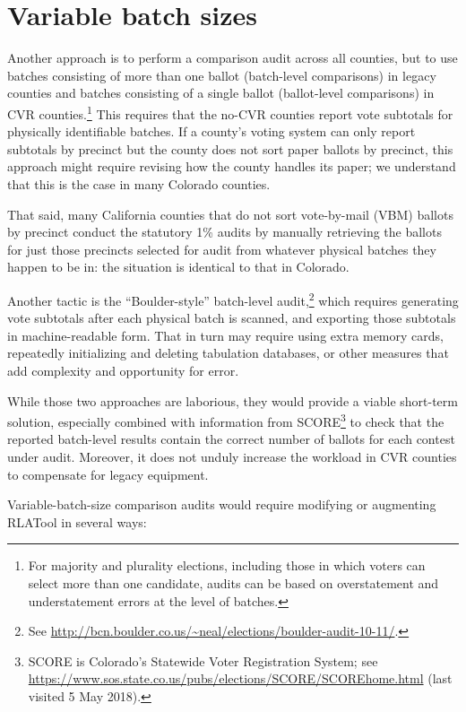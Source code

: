 \documentclass[runningheads]{llncs}
\begin{document}
\section{Variable batch sizes} \label{sec:variable}

Another approach is to perform a comparison audit across all counties, but to use batches consisting
of more than one ballot (batch-level comparisons)
in legacy counties and batches consisting of a single ballot (ballot-level comparisons) in CVR counties.\footnote{%
 For majority and plurality elections, including those in which voters can select more than one candidate,
  audits can be based on overstatement and understatement errors at the level of batches.
}
This requires that the no-CVR counties report vote subtotals
for physically identifiable batches.
If a county's voting system can only report subtotals by precinct but 
the county does not sort paper ballots by
precinct, this approach might require revising how the county handles its
paper; we understand that this is the case in many Colorado counties.

That said, many California counties that do not sort vote-by-mail (VBM)
ballots by precinct conduct the statutory 1\% audits by manually retrieving the ballots 
for just those precincts selected for audit from whatever physical batches they happen to be in: 
the situation is identical to that in Colorado.

Another tactic is the ``Boulder-style'' batch-level audit,\footnote{%
 See \url{http://bcn.boulder.co.us/~neal/elections/boulder-audit-10-11/}.
}
which requires generating 
vote subtotals after each physical batch is scanned, and exporting those subtotals in machine-readable form.
That in turn may require using extra memory cards, repeatedly initializing and deleting tabulation databases,
or other measures that add complexity and opportunity for error.

While those two approaches are laborious, they would provide a viable short-term solution,
especially combined with information from SCORE\footnote{%
 SCORE is Colorado's Statewide Voter Registration System; see
 \url{https://www.sos.state.co.us/pubs/elections/SCORE/SCOREhome.html} (last visited 5 May 2018).
}
to check that the reported batch-level results contain the correct number of ballots for each contest under audit.
Moreover, it does not unduly increase the workload in CVR counties
to compensate for legacy equipment.

Variable-batch-size comparison audits would require modifying or augmenting
RLATool in several ways: 
\end{document}
